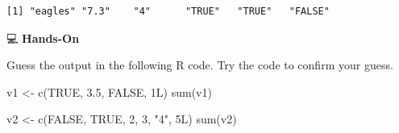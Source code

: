 \documentclass[
  letterpaper,
  DIV=11,
  numbers=noendperiod]{scrreprt}
\newenvironment{Shaded}{\begin{snugshade}}{\end{snugshade}}
\newcommand{\ConstantTok}[1]{\textcolor[rgb]{0.56,0.35,0.01}{#1}}
\newcommand{\DecValTok}[1]{\textcolor[rgb]{0.68,0.00,0.00}{#1}}
\newcommand{\FloatTok}[1]{\textcolor[rgb]{0.68,0.00,0.00}{#1}}
\newcommand{\FunctionTok}[1]{\textcolor[rgb]{0.28,0.35,0.67}{#1}}
\newcommand{\NormalTok}[1]{\textcolor[rgb]{0.00,0.23,0.31}{#1}}
\newcommand{\OtherTok}[1]{\textcolor[rgb]{0.00,0.23,0.31}{#1}}
\newcommand{\StringTok}[1]{\textcolor[rgb]{0.13,0.47,0.30}{#1}}
\begin{document}
\begin{verbatim}
[1] "eagles" "7.3"    "4"      "TRUE"   "TRUE"   "FALSE" 
\end{verbatim}

💻 \textbf{Hands-On}

Guess the output in the following R code. Try the code to confirm your
guess.

\begin{Shaded}
\begin{Highlighting}[]
\NormalTok{v1 }\OtherTok{\textless{}{-}} \FunctionTok{c}\NormalTok{(}\ConstantTok{TRUE}\NormalTok{, }\FloatTok{3.5}\NormalTok{, }\ConstantTok{FALSE}\NormalTok{, }\DecValTok{1}\NormalTok{L)}
\FunctionTok{sum}\NormalTok{(v1)}

\NormalTok{v2 }\OtherTok{\textless{}{-}} \FunctionTok{c}\NormalTok{(}\ConstantTok{FALSE}\NormalTok{, }\ConstantTok{TRUE}\NormalTok{, }\DecValTok{2}\NormalTok{, }\DecValTok{3}\NormalTok{, }\StringTok{"4"}\NormalTok{, }\DecValTok{5}\NormalTok{L)}
\FunctionTok{sum}\NormalTok{(v2)}
\end{Highlighting}
\end{Shaded}
\end{document}

